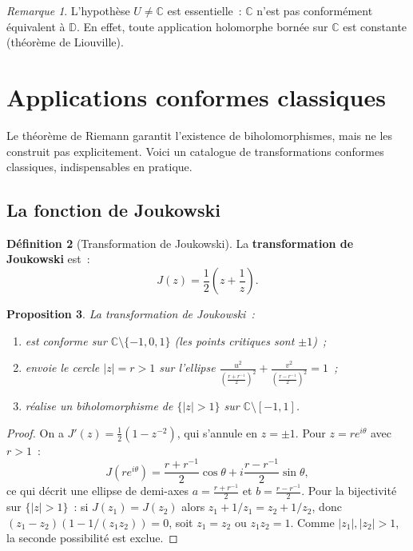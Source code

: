 \documentclass[12pt,a4paper,openany]{book}
\theoremstyle{definition}
\newtheorem{definition}{Définition}[chapter]
\theoremstyle{plain}
\newtheorem{proposition}[definition]{Proposition}
\theoremstyle{remark}
\newtheorem{remarque}[definition]{Remarque}
\newcommand{\C}{\mathbb{C}}
\newcommand{\D}{\mathbb{D}}
\newcommand{\abs}[1]{\left|#1\right|}
\begin{document}
\begin{remarque}\label{rem:riemann-C}
L'hypothèse $U \neq \C$ est essentielle~: $\C$ n'est pas conformément
équivalent à $\D$. En effet, toute application holomorphe bornée sur
$\C$ est constante (théorème de Liouville).
\end{remarque}

\section{Applications conformes classiques}\label{sec:conforme-classiques}

Le théorème de Riemann garantit l'existence de biholomorphismes, mais ne les
construit pas explicitement. Voici un catalogue de transformations conformes
classiques, indispensables en pratique.

\subsection{La fonction de Joukowski}

\begin{definition}[Transformation de Joukowski]\label{def:joukowski}
La \textbf{transformation de Joukowski} est~:
\[
  J(z) = \frac{1}{2}\left(z + \frac{1}{z}\right).
\]
\end{definition}

\begin{proposition}\label{prop:joukowski}
La transformation de Joukowski~:
\begin{enumerate}[label=(\roman*)]
  \item est conforme sur $\C \setminus \{-1, 0, 1\}$ (les points critiques sont $\pm 1$)~;
  \item envoie le cercle $\abs{z} = r > 1$ sur l'ellipse
    $\frac{u^2}{\left(\frac{r+r^{-1}}{2}\right)^2}
    + \frac{v^2}{\left(\frac{r-r^{-1}}{2}\right)^2} = 1$~;
  \item réalise un biholomorphisme de $\{\abs{z} > 1\}$ sur
    $\C \setminus [-1, 1]$.
\end{enumerate}
\end{proposition}

\begin{proof}
On a $J'(z) = \frac{1}{2}(1 - z^{-2})$, qui s'annule en $z = \pm 1$.
Pour $z = re^{i\theta}$ avec $r > 1$~:
\[
  J(re^{i\theta}) = \frac{r + r^{-1}}{2}\cos\theta + i\frac{r - r^{-1}}{2}\sin\theta,
\]
ce qui décrit une ellipse de demi-axes $a = \frac{r+r^{-1}}{2}$ et $b = \frac{r-r^{-1}}{2}$.
Pour la bijectivité sur $\{\abs{z}>1\}$~: si $J(z_1) = J(z_2)$ alors $z_1 + 1/z_1 = z_2 + 1/z_2$,
donc $(z_1 - z_2)(1 - 1/(z_1 z_2)) = 0$, soit $z_1 = z_2$ ou $z_1 z_2 = 1$.
Comme $\abs{z_1}, \abs{z_2} > 1$, la seconde possibilité est exclue.
\end{proof}
\end{document}
